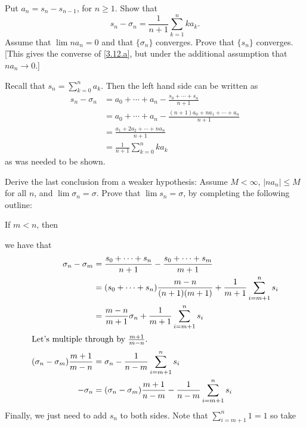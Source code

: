 \begin{exercise}
\begin{exercise}[label = (\alph*), ref = \arabic{exercisei} (\alph*)]
    Put \(a_n = s_n - s_{n - 1}\), for \(n\geq 1\).
    Show that
    \[
    s_n - \sigma_n = \frac{1}{n + 1}\sum_{k = 1}^nka_k.
    \]
    Assume that \(\lim na_n = 0\) and that \(\{\sigma_n\}\) converges.
    Prove that \(\{s_n\}\) converges.
    [This gives the converse of \cref{3.12.a}, but under the additional assumption
    that \(na_n\to 0\).]
    \par\smallskip
    Recall that \(s_n = \sum_{k = 0}^na_k\).
    Then the left hand side can be written as
    \begin{align*}
      s_n - \sigma_n & = a_0 + \cdots + a_n -
                       \frac{s_0 + \cdots + s_n}{n + 1}\\
                     & = a_0 + \cdots + a_n -
                       \frac{(n + 1)a_0 + na_1 + \cdots + a_n}{n + 1}\\
                     & = \frac{a_1 + 2a_2 + \cdots + na_n}{n + 1}\\
                     & = \frac{1}{n + 1}\sum_{k = 0}^nka_k
    \end{align*}
    as was needed to be shown.
  \item
    Derive the last conclusion from a weaker hypothesis: Assume \(M < \infty\),
    \(\lvert na_n\rvert\leq M\) for all \(n\), and \(\lim\sigma_n = \sigma\).
    Prove that \(\lim s_n = \sigma\), by completing the following outline:
    \par\smallskip
    If \(m < n\), then
    \par\smallskip
    {\color{NavyBlue}
      we have that
      \begin{align*}
        \sigma_n - \sigma_m
        & = \frac{s_0 + \cdots + s_n}{n + 1} -
          \frac{s_0 + \cdots + s_m}{m + 1}\\
        & = (s_0 + \cdots + s_n)\frac{m - n}{(n + 1)(m + 1)} +
          \frac{1}{m + 1}\sum_{i = m + 1}^ns_i\\
        & = \frac{m - n}{m + 1}\sigma_n + \frac{1}{m + 1}
          \sum_{i = m + 1}^ns_i\\
        \intertext{Let's multiple through by \(\frac{m + 1}{m - n}\).}
        (\sigma_n - \sigma_m)\frac{m + 1}{m - n}
        & = \sigma_n - \frac{1}{n - m}\sum_{i = m + 1}^ns_i\\
        -\sigma_n & = (\sigma_n - \sigma_m)\frac{m + 1}{n - m} -
                    \frac{1}{n - m}\sum_{i = m + 1}^ns_i
      \end{align*}
      Finally, we just need to add \(s_n\) to both sides.
      Note that \(\sum_{i = m + 1}^n1 = 1\) so take
}
\end{exercise}
\end{exercise}
